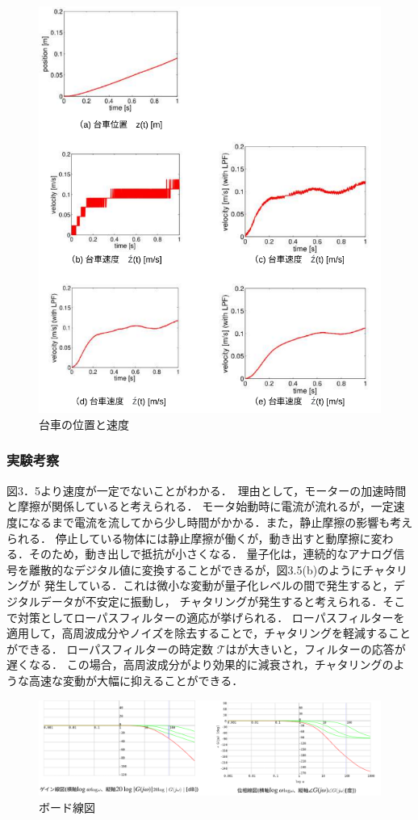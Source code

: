 \begin{figure}[h]
  \centering
  \includegraphics[scale=1]{sozai/3.pdf}
  \caption{台車の位置と速度}
\end{figure}


\subsubsection{実験考察}
図3．5より速度が一定でないことがわかる．　理由として，モーターの加速時間と摩擦が関係していると考えられる．
モータ始動時に電流が流れるが，一定速度になるまで電流を流してから少し時間がかかる．また，静止摩擦の影響も考えられる．
停止している物体には静止摩擦が働くが，動き出すと動摩擦に変わる．そのため，動き出しで抵抗が小さくなる．
量子化は，連続的なアナログ信号を離散的なデジタル値に変換することができるが，図3.5(b)のようにチャタリングが
発生している．これは微小な変動が量子化レベルの間で発生すると，デジタルデータが不安定に振動し，
チャタリングが発生すると考えられる．そこで対策としてローパスフィルターの適応が挙げられる．
ローパスフィルターを適用して，高周波成分やノイズを除去することで，チャタリングを軽減することができる．
ローパスフィルターの時定数 \(\mathcal{T}\)はが大きいと，フィルターの応答が遅くなる．
この場合，高周波成分がより効果的に減衰され，チャタリングのような高速な変動が大幅に抑えることができる．


\begin{figure}[h]
  \centering
  \includegraphics[scale=0.65]{sozai/4.pdf}
  \caption{ボード線図}
\end{figure}
